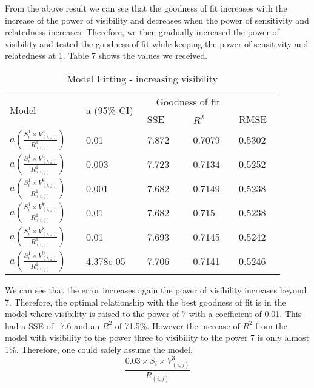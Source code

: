 \documentclass[10pt]{article}
\begin{document}
From the above result we can see that the goodness of fit increases with the increase of the power of visibility and decreases when the power of sensitivity and relatedness increases. Therefore, we then gradually increased the power of visibility and tested the goodness of fit while keeping the power of sensitivity and relatedness at 1. Table 7 shows the values we received.
\begin{center}
\begin{table}[htbp]
\caption{Model Fitting - increasing visibility}
\begin{center}
\begin{adjustbox}{width=0.5\textwidth} 
\begin{tabular}{|p{0.25\linewidth}|p{0.2\linewidth}|p{0.15\linewidth}|p{0.15\linewidth}|p{0.15\linewidth}|} 
\hline
\multirow{2}{*}{Model}&\multirow{2}{*}{a (95\% CI)}& \multicolumn{2}{c}{Goodness of fit} &\\   \cline{3-5}
& & SSE& $R^2$& RMSE\\
\hline
 $a(  \frac{S_{i}^1 \times V_{(i,j)}^4}{R_{(i,j)}^1})$ & 0.01 & 7.872 & 0.7079 & 0.5302\\
\hline
 $a(  \frac{S_{i}^1 \times V_{(i,j)}^5}{R_{(i,j)}^1}) $ & 0.003 & 7.723 & 0.7134 & 0.5252 \\
\hline
$a(  \frac{S_{i}^1 \times V_{(i,j)}^6}{R_{(i,j)}^1})$ & 0.001 & 7.682 & 0.7149 & 0.5238 \\
\hline
$a(  \frac{S_{i}^1 \times V_{(i,j)}^7}{R_{(i,j)}^1})$ & 0.01 & 7.682 & 0.715 & 0.5238 \\
\hline
$a(  \frac{S_{i}^1 \times V_{(i,j)}^8}{R_{(i,j)}^1})$ & 0.01 & 7.693 & 0.7145 & 0.5242 \\
\hline
$a(  \frac{S_{i}^1 \times V_{(i,j)}^9}{R_{(i,j)}^1})$ & 4.378e-05 & 7.706 & 0.7141 & 0.5246 \\
\hline
\end{tabular}
\end{adjustbox}
\end{center}
\end{table}
\end{center}

We can see that the error increases again the power of visibility increases beyond 7. Therefore, the optimal relationship with the best goodness of fit is in the model where visibility is raised to the power of 7 with a coefficient of 0.01. This had a SSE of ~7.6 and an $R^2$ of 71.5\%. However the increase of $R^2$ from the model with visibility to the power three to visibility to the power 7 is only almost 1\%. Therefore, one could safely assume the model,
\[
\frac{0.03 \times  S_{i} \times V_{(i,j)}^3}{R_{(i,j)}}
\]
\end{document}
